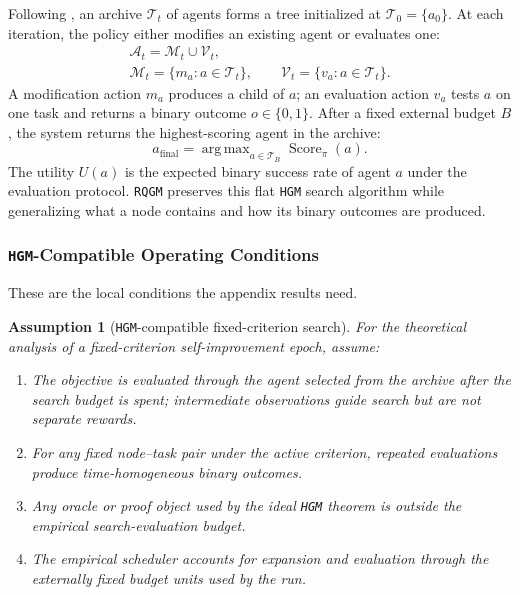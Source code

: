 \documentclass{paper}
\DeclareMathOperator*{\argmax}{arg\,max}
\newtheorem{assumption}{Assumption}
\newcommand{\ourmethod}{\texttt{RQGM}\xspace}
\newcommand{\hgm}{\texttt{HGM}\xspace}
\begin{document}
Following \citet{wang2025huxley}, an archive $\mathcal{T}_t$ of agents forms a tree initialized at $\mathcal{T}_0=\{a_0\}$. At each iteration, the policy either modifies an existing agent or evaluates one:
\[
\begin{gathered}
\mathcal{A}_t = \mathcal{M}_t \cup \mathcal{V}_t,\\
\mathcal{M}_t = \{m_a : a \in \mathcal{T}_t\},
\qquad
\mathcal{V}_t = \{v_a : a \in \mathcal{T}_t\}.
\end{gathered}
\]
A modification action $m_a$ produces a child of $a$; an evaluation action $v_a$ tests $a$ on one task and returns a binary outcome $o\in\{0,1\}$. After a fixed external budget $B$, the system returns the highest-scoring agent in the archive:
\[
a_{\mathrm{final}}
=
\argmax_{a\in\mathcal{T}_B}\operatorname{Score}_\pi(a).
\]
The utility $U(a)$ is the expected binary success rate of agent $a$ under the evaluation protocol. \ourmethod preserves this flat \hgm search algorithm while generalizing what a node contains and how its binary outcomes are produced.

\subsubsection{\texorpdfstring{\hgm}{HGM}-Compatible Operating Conditions}
\label{sec:prelim:assumptions}

These are the local conditions the appendix results need.

\begin{assumption}[\hgm-compatible fixed-criterion search]
\label{assumption:hgm}
For the theoretical analysis of a fixed-criterion self-improvement epoch, assume:
\begin{enumerate}[leftmargin=*,itemsep=0.2em,label=\textbf{C\arabic*.},ref=C\arabic*]
    \item \label{cond:final} The objective is evaluated through the agent selected from the archive after the search budget is spent; intermediate observations guide search but are not separate rewards.
    \item \label{cond:stationary} For any fixed node--task pair under the active criterion, repeated evaluations produce time-homogeneous binary outcomes.
    \item \label{cond:proofs} Any oracle or proof object used by the ideal \hgm theorem is outside the empirical search-evaluation budget.
    \item \label{cond:budget} The empirical scheduler accounts for expansion and evaluation through the externally fixed budget units used by the run.
\end{enumerate}
\end{assumption}
\end{document}
